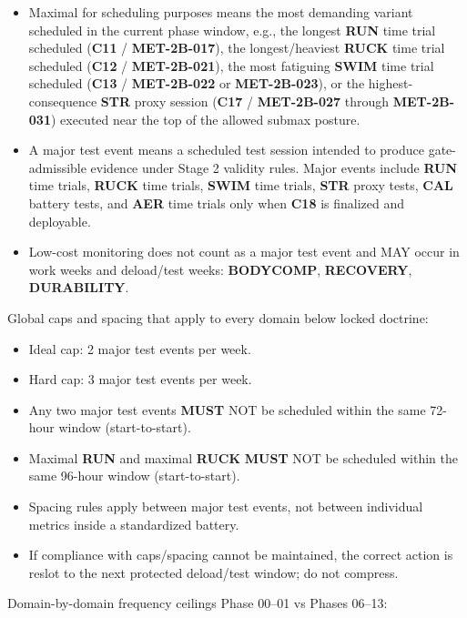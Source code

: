 \documentclass[10pt]{article}
\begin{document}
\begin{itemize}
\item Maximal for scheduling purposes means the most demanding variant scheduled in the current phase window, e.g., the longest \textbf{RUN} time trial scheduled (\textbf{C11} / \textbf{MET-2B-017}), the longest/heaviest \textbf{RUCK} time trial scheduled (\textbf{C12} / \textbf{MET-2B-021}), the most fatiguing \textbf{SWIM} time trial scheduled (\textbf{C13} / \textbf{MET-2B-022} or \textbf{MET-2B-023}), or the highest-consequence \textbf{STR} proxy session (\textbf{C17} / \textbf{MET-2B-027} through \textbf{MET-2B-031}) executed near the top of the allowed submax posture.
\item A major test event means a scheduled test session intended to produce gate-admissible evidence under Stage 2 validity rules. Major events include \textbf{RUN} time trials, \textbf{RUCK} time trials, \textbf{SWIM} time trials, \textbf{STR} proxy tests, \textbf{CAL} battery tests, and \textbf{AER} time trials only when \textbf{C18} is finalized and deployable.
\item Low-cost monitoring does not count as a major test event and MAY occur in work weeks and deload/test weeks: \textbf{BODYCOMP}, \textbf{RECOVERY}, \textbf{DURABILITY}.
\end{itemize}

Global caps and spacing that apply to every domain below locked doctrine:

\begin{itemize}
\item Ideal cap: 2 major test events per week.
\item Hard cap: 3 major test events per week.
\item Any two major test events \textbf{MUST} NOT be scheduled within the same 72-hour window (start-to-start).
\item Maximal \textbf{RUN} and maximal \textbf{RUCK} \textbf{MUST} NOT be scheduled within the same 96-hour window (start-to-start).
\item Spacing rules apply between major test events, not between individual metrics inside a standardized battery.
\item If compliance with caps/spacing cannot be maintained, the correct action is reslot to the next protected deload/test window; do not compress.
\end{itemize}

Domain-by-domain frequency ceilings Phase 00–01 vs Phases 06–13:
\end{document}
